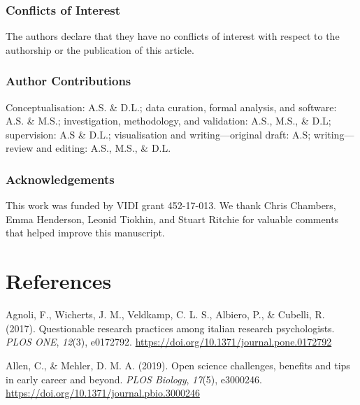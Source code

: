 \documentclass[british,,jou,floatsintext]{apa6}
\begin{document}
\hypertarget{conflicts-of-interest}{%
\subsubsection{Conflicts of Interest}\label{conflicts-of-interest}}

The authors declare that they have no conflicts of interest with respect to the authorship or the publication of this article.

\hypertarget{author-contributions}{%
\subsubsection{Author Contributions}\label{author-contributions}}

Conceptualisation: A.S. \& D.L.; data curation, formal analysis, and software: A.S. \& M.S.; investigation, methodology, and validation: A.S., M.S., \& D.L; supervision: A.S \& D.L.; visualisation and writing---original draft: A.S; writing---review and editing: A.S., M.S., \& D.L.

\hypertarget{acknowledgements}{%
\subsubsection{Acknowledgements}\label{acknowledgements}}

This work was funded by VIDI grant 452-17-013. We thank Chris Chambers, Emma Henderson, Leonid Tiokhin, and Stuart Ritchie for valuable comments that helped improve this manuscript.

\hypertarget{references}{%
\section{References}\label{references}}

\setlength{\parindent}{-0.2in}
\setlength{\leftskip}{0.2in}

\hypertarget{refs}{}
\leavevmode\hypertarget{ref-Agnoli2017}{}%
Agnoli, F., Wicherts, J. M., Veldkamp, C. L. S., Albiero, P., \& Cubelli, R. (2017). Questionable research practices among italian research psychologists. \emph{PLOS ONE}, \emph{12}(3), e0172792. \url{https://doi.org/10.1371/journal.pone.0172792}

\leavevmode\hypertarget{ref-Allen2019}{}%
Allen, C., \& Mehler, D. M. A. (2019). Open science challenges, benefits and tips in early career and beyond. \emph{PLOS Biology}, \emph{17}(5), e3000246. \url{https://doi.org/10.1371/journal.pbio.3000246}
\end{document}
